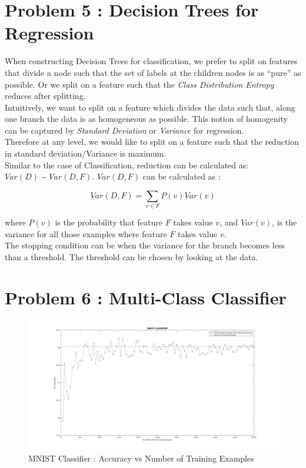 \documentclass{article}
\begin{document}
\section{Problem 5 : Decision Trees for Regression}
When constructing Decision Trees for classification, we prefer to split on features that divide a node such that the set of labels at the children nodes is as “pure” as possible. Or we split on a feature such that the \emph{Class Distribution Entropy} reduces after splitting. \\

Intuitively, we want to split on a feature which divides the data such that, along one branch the data is as homogeneous as possible. This notion of homogenity can be captured by \emph{Standard Deviation} or \emph{Variance} for regression. \\

Therefore at any level, we would like to split on a feature such that the reduction in standard deviation/Variance is maximum.\\

Similar to the case of Classification, reduction can be calculated as: $Var(D) - Var(D,F)$. $Var(D,F)$ can be calculated as :

$$Var(D,F) = \sum_{v \in F}P(v)Var(v)$$

where $P(v)$ is the probability that feature $F$ takes value $v$, and $Var(v)$, is the variance for all those examples where feature $F$ takes value $v$.\\

The stopping condition can be when the variance for the branch becomes less than a threshold. The threshold can be chosen by looking at the data.

\newpage

\section{Problem 6 : Multi-Class Classifier}
\begin{figure}[h!]
\includegraphics[width=1.12\columnwidth]{mnist_plot5.jpg}
\caption{MNIST Classifier : Accuracy vs Number of Training Examples}
\label{fig:one}
\end{figure}
\end{document}
